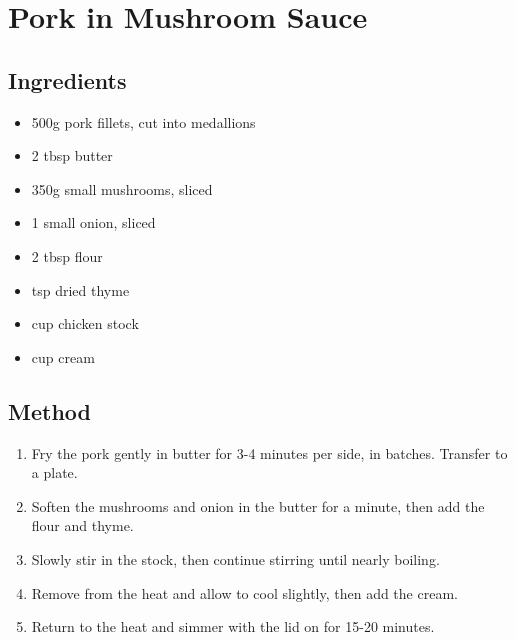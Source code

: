 \section{Pork in Mushroom Sauce}


\subsection{Ingredients}

\begin{itemize}
	\item 500g pork fillets, cut into medallions
	\item 2 tbsp butter
	\item 350g small mushrooms, sliced
	\item 1 small onion, sliced
	\item 2 tbsp flour
	\item {} tsp dried thyme
	\item {} cup chicken stock
	\item {} cup cream
\end{itemize}

\subsection{Method}

\begin{enumerate}
    \item Fry the pork gently in butter for 3-4 minutes per side, in batches. Transfer to a plate.
	\item Soften the mushrooms and onion in the butter for a minute, then add the flour and thyme.
	\item Slowly stir in the stock, then continue stirring until nearly boiling.
	\item Remove from the heat and allow to cool slightly, then add the cream.
	\item Return to the heat and simmer with the lid on for 15-20 minutes.
\end{enumerate}
